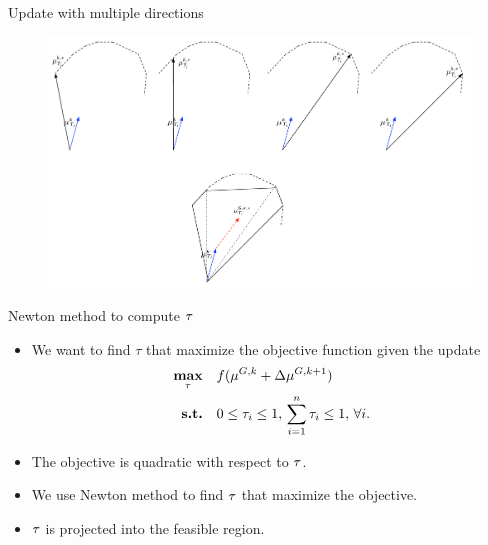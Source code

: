 \documentclass[first=dgreen,second=purple,logo=red]{aaltoslides}
\begin{document}
\begin{frame}{Update with multiple directions}
	\begin{figure}
		\begin{center}
			\includegraphics[scale=0.3]{multiple_update.pdf}
		\end{center}
	\end{figure}
\end{frame}

\begin{frame}{Newton method to compute $\mathbf {\tau}$}
	\begin{itemize}\footnotesize
		\item We want to find $\tau$ that maximize the objective function given the update
		\begin{align*}
			\underset{\tau}{\textbf{max}} & \quad f(\mathbf {\mu}^{G,k} + \Delta{\mathbf {\mu}}^{G,k+1})\\
			\textbf{s.t.} & \quad 0\le\tau_i\le1,\,\sum_{i=1}^n\tau_i\le1,\,\forall i.
		\end{align*}
		\item The objective is quadratic with respect to $\mathbf {\tau}$.
		\item We use Newton method to find $\mathbf {\tau}$ that maximize the objective.
		\item $\mathbf {\tau}$ is projected into the feasible region.
	\end{itemize}
\end{frame}
\fi
\end{document}
